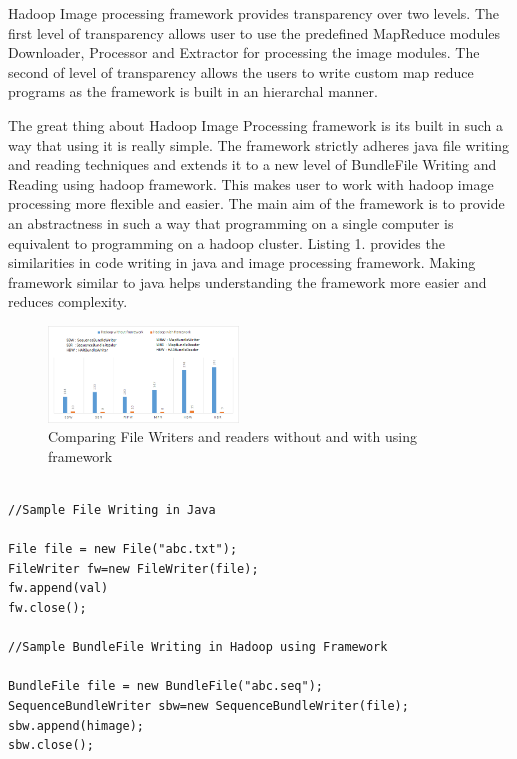 \documentclass[conference]{IEEEtran}
\begin{document}
Hadoop Image processing framework provides transparency over two levels. The first level of transparency allows user to use the predefined MapReduce modules Downloader, Processor and Extractor for processing the image modules. The second of level of transparency allows the users to write custom map reduce programs as the framework is built in an hierarchal manner.

The great thing about Hadoop Image Processing framework is its built in such a way that using it is really simple. The framework strictly adheres java file writing and reading techniques and extends it to a new level of BundleFile Writing and Reading using hadoop framework. This makes user to work with hadoop image processing more flexible and easier. The main aim of the framework is to provide an abstractness in such a way that programming on a single computer is equivalent to programming on a hadoop cluster.  Listing 1. provides the similarities in code writing in java and image processing framework. Making framework similar to java helps understanding the framework more easier and reduces complexity.


\begin{figure}[h]
	\centering
	\includegraphics[width=0.45\textwidth]{files-chart}
	\caption{Comparing File Writers and readers without and with using framework }
	\label{fig:files-chart}
\end{figure}

\begin{lstlisting}[caption = Comparing File Writer instance in java and SequenceBundleWriter instance in Hadoop Image Processing framework ]

//Sample File Writing in Java

File file = new File("abc.txt");
FileWriter fw=new FileWriter(file);
fw.append(val)
fw.close();

//Sample BundleFile Writing in Hadoop using Framework

BundleFile file = new BundleFile("abc.seq");
SequenceBundleWriter sbw=new SequenceBundleWriter(file);
sbw.append(himage);
sbw.close();

\end{lstlisting}
\end{document}
